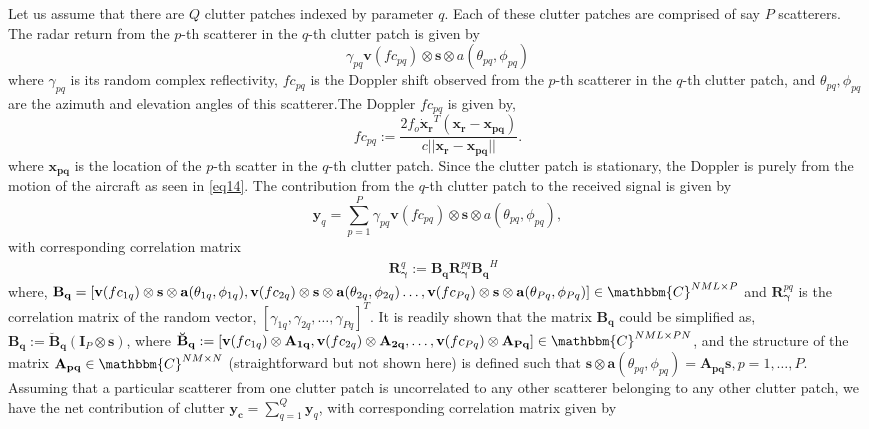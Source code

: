 \documentclass[11pt,draftclsnofoot,onecolumn]{IEEEtran}
\theoremstyle{definition}
\theoremstyle{remark}
\begin{document}
Let us assume that there are $Q$ clutter patches indexed by parameter $q$. Each of these clutter patches are comprised of say $P$ scatterers. The radar return from the $p$-th scatterer in the $q$-th clutter patch is given by
\begin{equation*}
\gamma_{pq}\mathbf{v}(fc_{pq})\otimes\mathbf{s} \otimes a(\theta_{pq},\phi_{pq})
\end{equation*}
where $\gamma_{pq}$ is its random complex reflectivity, $fc_{pq}$ is the Doppler shift observed from the $p$-th scatterer in the $q$-th clutter patch, and $\theta_{pq},\phi_{pq}$ are the azimuth and elevation angles of this scatterer.The Doppler $fc_{pq}$ is given by,
\begin{equation} \label{eq14}
fc_{pq}:=\dfrac{2f_o\mathbf{\dot{x}_r}^T (\mathbf{x_r}-\mathbf{x_{pq} })}{c||\mathbf{x_r}-\mathbf{x_{pq} }||}.
\end{equation}
where $\mathbf{x_{pq}}$ is the location of the $p$-th scatter in the $q$-th clutter patch. Since the clutter patch is stationary, the Doppler is purely from the motion of the aircraft as seen in \eqref{eq14}. The contribution from the $q$-th clutter patch to the received signal is given by
\begin{equation} \label{eq15}
\mathbf{y}_q=\sum \limits_{p=1}^P \gamma_{pq} \mathbf{v}(fc_{pq} )\otimes\mathbf{s} \otimes a(\theta_{pq},\phi_{pq} ),
\end{equation}
with corresponding correlation matrix 
\begin{align} \label{cluteq}
&\mathbf{R}_{\boldsymbol{\gamma}}^q:=\mathbf{B_q}\mathbf{R}_{\boldsymbol{\gamma}}^{pq} \mathbf{B_q}^H
\end{align}
where, 
$\mathbf{B_q}
=[\mathbf{v}(fc_{1q})\otimes\mathbf{s} \otimes \mathbf{a}(\theta_{1q},\phi_{1q}), \mathbf{v}(fc_{2q})\otimes\mathbf{s} \otimes \mathbf{a}(\theta_{2q},\phi_{2q})\ldots,\mathbf{v}(fc_{Pq})\otimes\mathbf{s} \otimes \mathbf{a}(\theta_{Pq},\phi_{Pq})] \in\mathbbm{C}^{NML\times P}$ and $\mathbf{R}_{\boldsymbol{\gamma}}^{pq}$ is the correlation matrix of the random vector, $[\gamma_{1q},\gamma_{2q},\ldots,\gamma_{Pq}]^T$. It is readily shown that the matrix $\mathbf{B_q}$ could be simplified as, $\mathbf{B_q}:=\mathbf{\breve{B}_q}(\mathbf{I}_P\otimes\mathbf{s})$, where $\mathbf{\breve{B}_q}:=[\mathbf{v}(fc_{1q})\otimes\mathbf{A_{1q}},\mathbf{v}(fc_{2q})\otimes\mathbf{A_{2q}},\ldots, \mathbf{v}(fc_{Pq})\otimes\mathbf{A_{Pq}}]\in \mathbbm{C}^{NML\times PN}$, and the structure of the matrix $\mathbf{A_{pq}}\in\mathbbm{C}^{NM\times N}$ (straightforward but not shown here) is defined such that $\mathbf{s}\otimes\mathbf{a}(\theta_{pq},\phi_{pq} )=\mathbf{A_{pq}}\mathbf{s},p=1,\ldots,P$. Assuming that a particular scatterer from one clutter patch is uncorrelated to any other scatterer belonging to any other clutter patch, we have the net contribution of clutter $\mathbf{y_c}=\sum\limits_{q=1}^Q \mathbf{y}_q$, with corresponding correlation matrix given by
\end{document}

